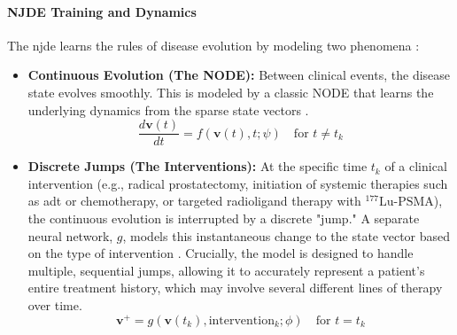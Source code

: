 \documentclass[11pt, a4paper]{article}
\begin{document}
\paragraph{NJDE Training and Dynamics}
The \gls{njde} learns the rules of disease evolution by modeling two phenomena \cite{GwakSim2020}:
\begin{itemize}
    \item \textbf{Continuous Evolution (The NODE):} Between clinical events, the disease state evolves smoothly. This is modeled by a classic NODE that learns the underlying dynamics from the sparse state vectors \cite{BergHasenclever2018}.
    $$ \frac{d\mathbf{v}(t)}{dt} = f(\mathbf{v}(t), t; \psi) \quad \text{for } t \neq t_k $$
    \item \textbf{Discrete Jumps (The Interventions):} At the specific time $t_k$ of a clinical intervention (e.g., radical prostatectomy, initiation of systemic therapies such as \gls{adt} or chemotherapy, or targeted radioligand therapy with $^{\text{177}}\text{Lu-PSMA}$), the continuous evolution is interrupted by a discrete "jump." A separate neural network, $g$, models this instantaneous change to the state vector based on the type of intervention \cite{CuchieroLarsson2019, AbushaqraXue2022}. Crucially, the model is designed to handle multiple, sequential jumps, allowing it to accurately represent a patient's entire treatment history, which may involve several different lines of therapy over time.
    $$ \mathbf{v}^+ = g(\mathbf{v}(t_k), \text{intervention}_k; \phi) \quad \text{for } t = t_k $$
\end{itemize}
\end{document}
